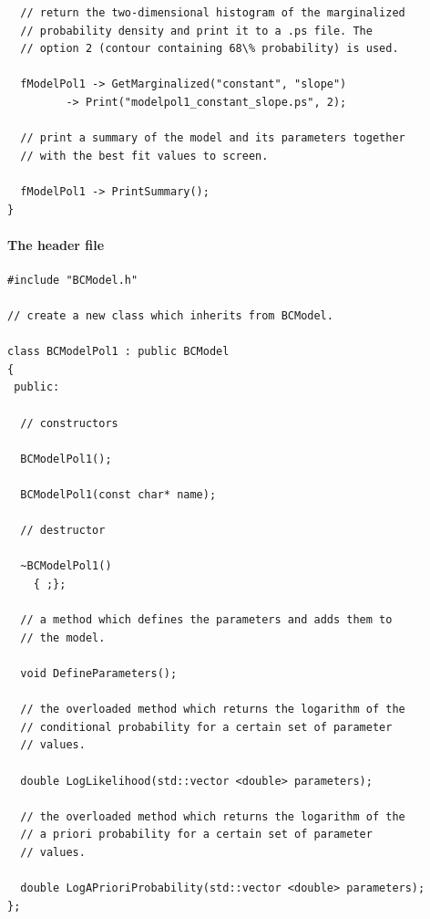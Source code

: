 \documentclass[11pt, a4paper]{article}
\begin{document}
\begin{small}
\begin{verbatim}
  // return the two-dimensional histogram of the marginalized 
  // probability density and print it to a .ps file. The 
  // option 2 (contour containing 68\% probability) is used. 

  fModelPol1 -> GetMarginalized("constant", "slope") 
	     -> Print("modelpol1_constant_slope.ps", 2);

  // print a summary of the model and its parameters together 
  // with the best fit values to screen. 

  fModelPol1 -> PrintSummary(); 
} 
\end{verbatim} 
\end{small} 

\pagebreak 

\paragraph{The header file} 
\label{paragraph:headerfile}
% 
\begin{small} 
\begin{verbatim}
#include "BCModel.h" 

// create a new class which inherits from BCModel. 

class BCModelPol1 : public BCModel 
{
 public: 

  // constructors 

  BCModelPol1(); 

  BCModelPol1(const char* name); 

  // destructor 

  ~BCModelPol1()
    { ;};  

  // a method which defines the parameters and adds them to 
  // the model. 

  void DefineParameters(); 

  // the overloaded method which returns the logarithm of the 
  // conditional probability for a certain set of parameter 
  // values. 

  double LogLikelihood(std::vector <double> parameters); 

  // the overloaded method which returns the logarithm of the 
  // a priori probability for a certain set of parameter 
  // values. 

  double LogAPrioriProbability(std::vector <double> parameters); 
}; 
\end{verbatim} 
\end{small} 

\pagebreak 
\end{document}
